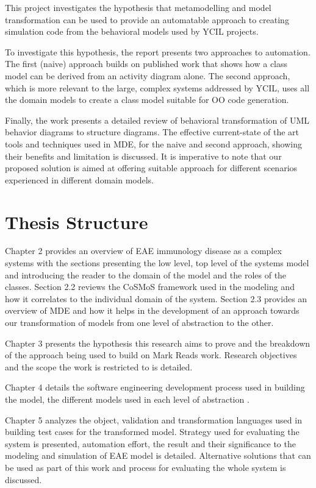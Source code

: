 \documentclass[12pt, a4paper]{report}
\begin{document}
This project investigates the hypothesis that metamodelling and model transformation can be used to provide an automatable approach to creating simulation code from the behavioral models used by YCIL projects. 

To investigate this hypothesis, the report presents two approaches to automation. The first (naive) approach builds on published work that shows how a class model can be derived from an activity diagram alone.  The second approach, which is more relevant to the large, complex systems addressed by YCIL, uses all the domain models to create a class model suitable for OO code generation. 

Finally, the work presents a detailed review of behavioral transformation of UML behavior diagrams to structure diagrams. The effective current-state of the art tools and techniques used in MDE, for the naive and second approach, showing their benefits and limitation is discussed. It is imperative to note that our proposed solution is aimed at offering suitable approach for different scenarios experienced in different domain models. 

\section{Thesis Structure}
Chapter 2 provides an overview of EAE immunology disease as a complex systems with the sections presenting the low level, top level of the systems model and introducing the reader to the domain of the model and the roles of the classes. Section 2.2 reviews the CoSMoS framework used in the modeling and how it correlates to the individual domain of the system. Section 2.3 provides an overview of MDE and how it helps in the development of an approach towards our transformation of models from one level of abstraction to the other.

Chapter 3 presents the hypothesis this research aims to prove and the breakdown of the approach being used to build on Mark Reads work. Research objectives and the scope the work is restricted to is detailed.

Chapter 4 details the software engineering development process used in building the model, the different models used in each level of abstraction .

Chapter 5 analyzes the object, validation and transformation languages used in building test cases for the transformed model. Strategy used for evaluating the system is presented, automation effort, the result and their significance to the modeling and simulation of EAE model is detailed. Alternative solutions that can be used as part of this work and process for evaluating the whole system is discussed.
\end{document}
